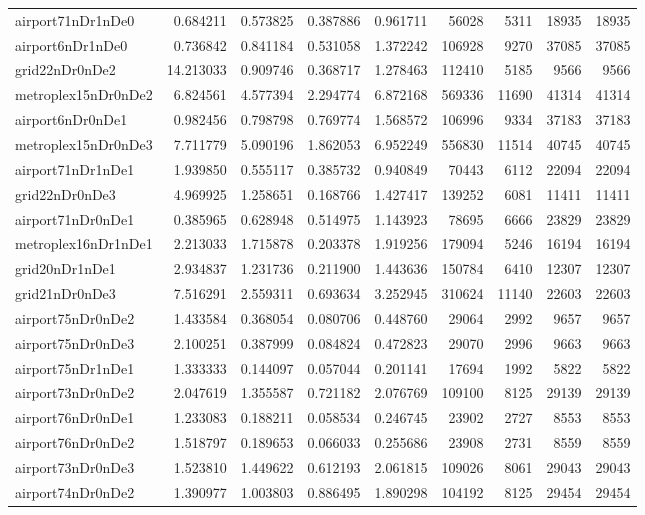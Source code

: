 \begin{longtable}{|l|r|r|r|r|r|r|r|r|}
airport71nDr1nDe0 & 0.684211 & 0.573825 & 0.387886 & 0.961711 & 56028 & 5311 & 18935 & 18935 \\
airport6nDr1nDe0 & 0.736842 & 0.841184 & 0.531058 & 1.372242 & 106928 & 9270 & 37085 & 37085 \\
grid22nDr0nDe2 & 14.213033 & 0.909746 & 0.368717 & 1.278463 & 112410 & 5185 & 9566 & 9566 \\
metroplex15nDr0nDe2 & 6.824561 & 4.577394 & 2.294774 & 6.872168 & 569336 & 11690 & 41314 & 41314 \\
airport6nDr0nDe1 & 0.982456 & 0.798798 & 0.769774 & 1.568572 & 106996 & 9334 & 37183 & 37183 \\
metroplex15nDr0nDe3 & 7.711779 & 5.090196 & 1.862053 & 6.952249 & 556830 & 11514 & 40745 & 40745 \\
airport71nDr1nDe1 & 1.939850 & 0.555117 & 0.385732 & 0.940849 & 70443 & 6112 & 22094 & 22094 \\
grid22nDr0nDe3 & 4.969925 & 1.258651 & 0.168766 & 1.427417 & 139252 & 6081 & 11411 & 11411 \\
airport71nDr0nDe1 & 0.385965 & 0.628948 & 0.514975 & 1.143923 & 78695 & 6666 & 23829 & 23829 \\
metroplex16nDr1nDe1 & 2.213033 & 1.715878 & 0.203378 & 1.919256 & 179094 & 5246 & 16194 & 16194 \\
grid20nDr1nDe1 & 2.934837 & 1.231736 & 0.211900 & 1.443636 & 150784 & 6410 & 12307 & 12307 \\
grid21nDr0nDe3 & 7.516291 & 2.559311 & 0.693634 & 3.252945 & 310624 & 11140 & 22603 & 22603 \\
airport75nDr0nDe2 & 1.433584 & 0.368054 & 0.080706 & 0.448760 & 29064 & 2992 & 9657 & 9657 \\
airport75nDr0nDe3 & 2.100251 & 0.387999 & 0.084824 & 0.472823 & 29070 & 2996 & 9663 & 9663 \\
airport75nDr1nDe1 & 1.333333 & 0.144097 & 0.057044 & 0.201141 & 17694 & 1992 & 5822 & 5822 \\
airport73nDr0nDe2 & 2.047619 & 1.355587 & 0.721182 & 2.076769 & 109100 & 8125 & 29139 & 29139 \\
airport76nDr0nDe1 & 1.233083 & 0.188211 & 0.058534 & 0.246745 & 23902 & 2727 & 8553 & 8553 \\
airport76nDr0nDe2 & 1.518797 & 0.189653 & 0.066033 & 0.255686 & 23908 & 2731 & 8559 & 8559 \\
airport73nDr0nDe3 & 1.523810 & 1.449622 & 0.612193 & 2.061815 & 109026 & 8061 & 29043 & 29043 \\
airport74nDr0nDe2 & 1.390977 & 1.003803 & 0.886495 & 1.890298 & 104192 & 8125 & 29454 & 29454 \\

\end{longtable}
